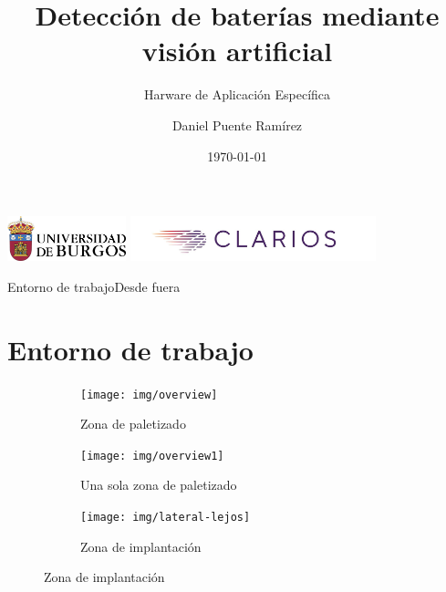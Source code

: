 \documentclass{beamer}
\author[Daniel Puente Ramírez]{Daniel Puente Ramírez}
\institute[]{Universidad de Burgos}
\title[Detección de baterías]{Detección de baterías mediante visión artificial}
\subtitle{Harware de Aplicación Específica}
\date{\today}
\begin{document}
\begin{frame}
	\titlepage
	\begin{center}
  		\includegraphics[height=1.3cm]{img/Escudo-Apaisado}
		\includegraphics[height=1.3cm]{img/Clarios}
	\end{center}
\end{frame}



\begin{frame}
\tableofcontents
\end{frame}

\begin{frame}{Entorno de trabajo}{Desde fuera}
\section{Entorno de trabajo}
\begin{figure}

\begin{subfigure}{0.3\textwidth}
\centering
  \texttt{[image: img/overview]}
  \caption{Zona de paletizado}
  \label{fig:palet-zone}
\end{subfigure}\hfill
\begin{subfigure}{0.3\textwidth}
\centering
  \texttt{[image: img/overview1]}
  \caption{Una sola zona de paletizado}
  \label{fig:palet-one}
\end{subfigure}\hfill
\begin{subfigure}{0.3\textwidth}
\centering
  \texttt{[image: img/lateral-lejos]}
  \caption{Zona de implantación}
  \label{fig:implantacion}
\end{subfigure}
\end{figure}
\end{frame}
\end{document}
